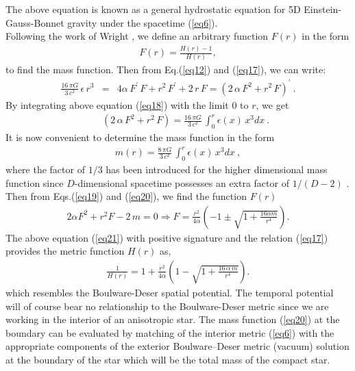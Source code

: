\documentclass[]{aastex631}
\begin{document}
The above equation is known as a general hydrostatic equation for 5D Einstein-Gauss-Bonnet gravity under the spacetime (\ref{eq6}). \\
Following the work of Wright \citep{Wright}, we define an arbitrary function $F(r)$ in the form 
\begin{eqnarray}
F(r)=\frac{H(r)-1}{H(r)}, \label{eq17}
\end{eqnarray}
to find the mass function. 
 Then from Eq.(\ref{eq12}) and (\ref{eq17}), we can write:
\begin{eqnarray}
\frac{16\,\pi G}{3\,c^2}\,\epsilon\,r^3 &=& 4\alpha\,F^\prime\,F+ r^2\,F^\prime+2\,r\,F = ( 2\,\alpha\,F^2+r^2\,F)^\prime ~. \label{eq18}
\end{eqnarray}
By integrating above equation (\ref{eq18}) with the limit $0$ to $r$, we get
\begin{eqnarray}
&&( 2\,\alpha\,F^2+r^2\,F)=\frac{16\,\pi G}{3\,c^2}\,\int^r_0 \epsilon(x)\,x^3 dx ~. \label{eq19}
\end{eqnarray}
It is now convenient to determine the mass function in the form  
\begin{eqnarray}
m(r)=\frac{8\,\pi G}{3\,c^2}\,\int^r_0 \epsilon(x)\,x^3 dx~, \label{eq20}
\end{eqnarray}
where the factor of $1/3$ has been introduced for the higher dimensional mass function since $D$-dimensional spacetime possesses an extra factor of $1/(D -2)$ \citep{Ponce}. 
Then from Eqs.(\ref{eq19}) and (\ref{eq20}), we find the function $F(r)$
\begin{eqnarray}
2\alpha F^2+r^2 F-2\,m=0 \Longrightarrow F=\frac{r^2}{4 \alpha}
\left(-1\pm\sqrt{1+\frac{16\alpha m}{r^4}}\right).\label{eq21}
\end{eqnarray}
The above equation (\ref{eq21}) with positive signature and the relation (\ref{eq17}) provides the metric function $H(r)$ as,
\begin{eqnarray}
\frac{1}{H(r)}=1+\frac{r^2}{4 \alpha}
\left(1-\sqrt{1+\frac{16\,\alpha\, m}{r^4}}\right).  \label{eq22}
\end{eqnarray}
which resembles the Boulware-Deser spatial potential. The temporal potential will of course bear no relationship to the Boulware-Deser metric since we are working in the interior of an anisotropic star. The mass function (\ref{eq20}) at the boundary can be evaluated by matching of the interior metric (\ref{eq6}) with the appropriate components of the  exterior Boulware--Deser metric  \citep{boul} (vacuum) solution at the boundary of the star which will be the total mass of the compact star. 
\end{document}
